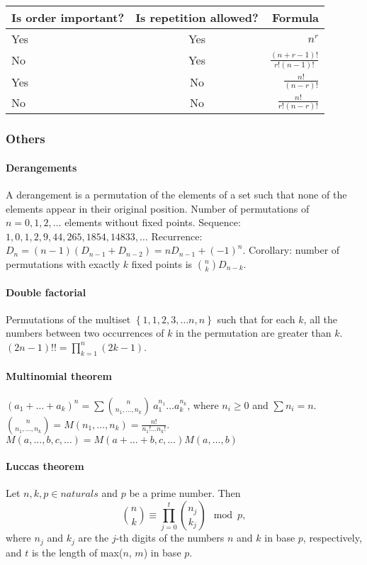 \documentclass[10pt,letterpaper,twocolumn,twosided]{article}
\begin{document}
\begin{tabular}[t]{|l |c |r|}
\hline
Is order important? & Is repetition allowed? & Formula \\
\hline
Yes & Yes & $ {n^r} $ \\
\hline
No & Yes & ${\frac{(n+r-1)!}{r!(n-1)!}} $ \\
\hline
Yes & No & $ {\frac{n!}{(n-r)!}} $ \\
\hline
No & No & $ {\frac{n!}{r!(n-r)!}} $  \\
\hline
\end{tabular}

\subsubsection{Others}

\paragraph{Derangements} A derangement is a permutation of the elements of a set such that none of the elements appear in their original position. Number of permutations of $n=0,1,2,\dots$ elements without fixed points. Sequence: $1,0,1,2,9,44,265,1854,14833,\dots$
Recurrence: $D_{n}=(n-1)(D_{n-1}+D_{n-2})=nD_{n-1}+(-1)^{n}$. Corollary:
number of permutations with exactly $k$ fixed points is ${n \choose k}D_{n-k}$. 


\paragraph{Double factorial} Permutations of the multiset $\left\{ 1,1,2,3,\dots n,n\right\} $
such that for each $k$, all the numbers between two occurrences of
$k$ in the permutation are greater than $k$. $(2n-1)!!=\prod_{k=1}^{n}\left(2k-1\right)$.


\paragraph{Multinomial theorem} $(a_{1}+\dots+a_{k})^{n}=\sum{n \choose n_{1},\dots,n_{k}}\ a_{1}^{n_{1}}\dots a_{k}^{n_{k}}$,
where $n_{i}\ge0$ and $\sum n_{i}=n$. \\
 ${n \choose n_{1},\dots,n_{k}}=M(n_{1},\dots,n_{k})=\frac{n!}{n_{1}!\dots n_{k}!}$.
$M(a,\dots,b,c,\dots)=M(a+\dots+b,c,\dots)M(a,\dots,b)$

\paragraph{Luccas theorem} Let $n,k,p\in naturals$ and $p$ be a prime number. Then
\[ \binom nk \equiv \prod_{j=0}^t \binom{n_j}{k_j} \mod p, \]
where $n_j$ and $k_j$ are the $j$-th digits of the numbers $n$ and $k$ in base $p$, respectively, and $t$ is the length of max($n$, $m$) in base $p$.
        
\end{document}
